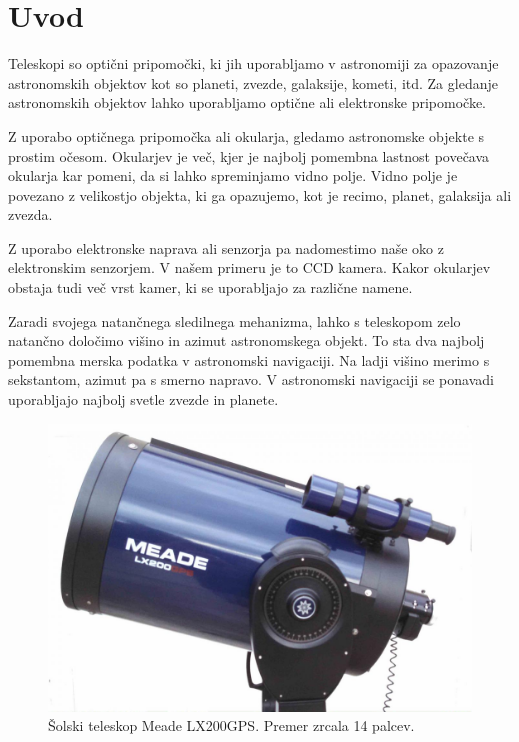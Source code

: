 \documentclass[11pt,a4]{article}
\begin{document}
\section{Uvod}
Teleskopi so optični pripomočki, ki jih uporabljamo v astronomiji za opazovanje astronomskih objektov kot so planeti, zvezde, galaksije, kometi, itd. Za gledanje astronomskih objektov lahko uporabljamo optične ali elektronske pripomočke.

Z uporabo optičnega pripomočka ali okularja, gledamo astronomske objekte s prostim očesom. Okularjev je več, kjer je najbolj pomembna lastnost povečava okularja kar pomeni, da si lahko spreminjamo vidno polje. Vidno polje je povezano z velikostjo objekta, ki ga opazujemo, kot je recimo, planet, galaksija ali zvezda.

Z uporabo elektronske naprava ali senzorja pa nadomestimo naše oko z elektronskim senzorjem. V našem primeru je to CCD kamera. Kakor okularjev obstaja tudi več vrst kamer, ki se uporabljajo za različne namene. 
  
Zaradi svojega natančnega sledilnega mehanizma, lahko s teleskopom zelo natančno določimo višino in azimut astronomskega objekt. To sta dva najbolj pomembna merska podatka v astronomski navigaciji. Na ladji višino merimo s sekstantom, azimut pa s smerno napravo. V astronomski navigaciji se ponavadi uporabljajo najbolj svetle zvezde in planete. 

\begin{figure}[tb]
	\begin{center}
		\includegraphics[width=12cm]{figs/meade_lx200gps.png}
	\end{center}
\caption{Šolski teleskop Meade LX200GPS. Premer zrcala 14 palcev.}
\end{figure}
\end{document}
